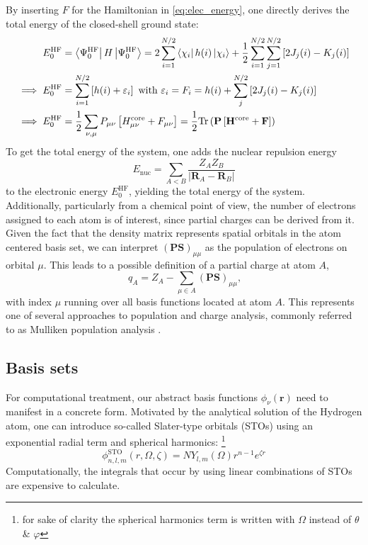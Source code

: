 By inserting $F$ for the Hamiltonian in \autoref{eq:elec_energy}, one directly derives the total energy of the closed-shell ground state: 
\begin{subequations}
\begin{align}
    E^\text{HF}_0 &= \bra{\Psi^\text{HF}_0} H \ket{\Psi^\text{HF}_0} = 2\sum_{i=1}^{N/2} \bra{\chi_i} h(i) \ket{\chi_i}
    + \frac{1}{2}\sum_{i=1}^{N/2}\sum_{j=1}^{N/2} \left[ 2 J_j(i) - K_j(i) \right]\\
    \implies E^\text{HF}_0 &= \sum_{i=1}^{N/2}\left[ h(i) + \varepsilon_i\right] \text{  with  } \varepsilon_i = F_i =  h(i) + \sum_{j}^{N/2} \left[ 2 J_j(i) - K_j(i) \right]\\
    \implies E^\text{HF}_0 &= \frac{1}{2} \sum_{\nu, \mu} P_{\mu \nu} \left[ H_{\mu \nu}^\text{core} + F_{\mu \nu} \right] = \frac{1}{2} \text{Tr} \left( \mathbf{P} \left[ \mathbf{H}^\text{core} + \mathbf{F} \right] \right)
\end{align}
\end{subequations}
To get the total energy of the system, one adds the nuclear repulsion energy 
\begin{equation}
E_\text{nuc} = \sum_{A<B} \frac{Z_A Z_B}{|\mathbf{R}_A - \mathbf{R}_B|}
\end{equation}
to the electronic energy $E^\text{HF}_0$, yielding the total energy of the system. Additionally, particularly from a chemical point of view, the number of electrons assigned to each atom is of interest, since partial charges can be derived from it. Given the fact that the density matrix represents spatial orbitals in the atom centered basis set, we can interpret $\mathbf{(PS)}_{\mu \mu}$ as the population of electrons on orbital $\mu$. This leads to a possible definition of a partial charge at atom $A$,
\begin{equation}
    \
    q_A = Z_A - \sum_{\mu \in A} \mathbf{(PS)}_{\mu \mu},
\end{equation}
with index $\mu$ running over all basis functions located at atom $A$. This represents one of several approaches to population and charge analysis, commonly referred to as Mulliken population analysis \parencite{ref:mulliken1955electronic}. 
\subsection{Basis sets}
\label{subsec:background_hf_basis_sets}
For computational treatment, our abstract basis functions $\phi_\nu(\mathbf{r})$ need to manifest in a concrete form. 
Motivated by the analytical solution of the Hydrogen atom, one can introduce so-called Slater-type orbitals (STOs) using an exponential radial term and spherical harmonics: \footnote{for sake of clarity the spherical harmonics term is written with $\Omega$ instead of $\theta$ \& $\varphi$}
\begin{equation}
    \label{eq:slater_orbital}
    \phi_{n, l, m}^{\text{STO}}(r, \Omega, \zeta) = N Y_{l,m}(\Omega) r^{n-1} e^{\zeta r}
\end{equation} 
Computationally, the integrals that occur by using linear combinations of STOs are expensive to calculate. \\

